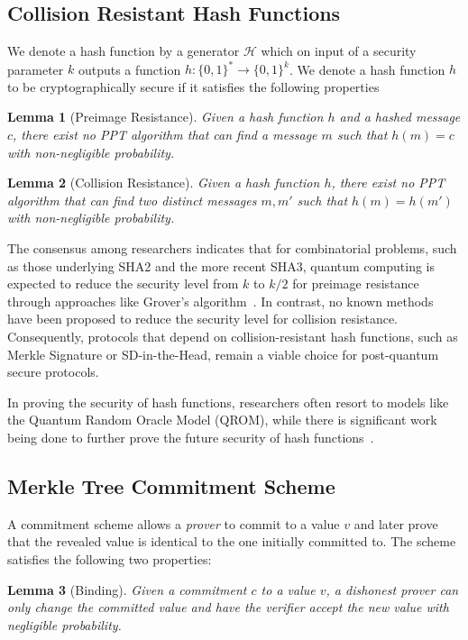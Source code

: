 \documentclass[twoside,11pt]{report}
\theoremstyle{definition}
\theoremstyle{plain}
\newtheorem{lemma}{Lemma}[section]
\begin{document}
\subsection{Collision Resistant Hash Functions}
We denote a hash function by a generator $\mathcal{H}$ which on input of a security parameter $k$ outputs a function $h : \{0,1{\}}^* \rightarrow \{0,1{\}}^k$. We denote a hash function $h$ to be cryptographically secure if it satisfies the following properties

\begin{lemma}[Preimage Resistance]\label{lem:preimage}
  Given a hash function $h$ and a hashed message $c$, there exist no PPT algorithm that can find a message $m$ such that $h(m) = c$ with non-negligible probability.
\end{lemma}

\begin{lemma}[Collision Resistance]\label{lem:collision}
  Given a hash function $h$, there exist no PPT algorithm that can find two distinct messages $m, m'$ such that $h(m) = h(m')$ with non-negligible probability.
\end{lemma}

The consensus among researchers indicates that for combinatorial problems, such as those underlying SHA2 and the more recent SHA3, quantum computing is expected to reduce the security level from $k$ to $k/2$ for preimage resistance through approaches like Grover's algorithm~\cite{nielsen2010quantumgrover}. In contrast, no known methods have been proposed to reduce the security level for collision resistance. Consequently, protocols that depend on collision-resistant hash functions, such as Merkle Signature or SD-in-the-Head, remain a viable choice for post-quantum secure protocols.

In proving the security of hash functions, researchers often resort to models like the Quantum Random Oracle Model (QROM), while there is significant work being done to further prove the future security of hash functions~\cite{dtuPostquantumSecurity}.

\subsection{Merkle Tree Commitment Scheme}
A commitment scheme allows a \textit{prover} to commit to a value $v$ and later prove that the revealed value is identical to the one initially committed to. The scheme satisfies the following two properties:

\begin{lemma}[Binding]\label{lem:binding}
  Given a commitment $c$ to a value $v$, a dishonest prover can only change the committed value and have the verifier accept the new value with negligible probability.
\end{lemma}
\end{document}
